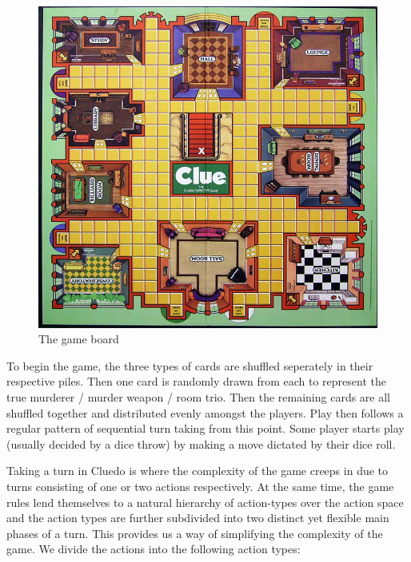 \documentclass[msc, ai, twoside, notimes, logo, parskip, leftchapter, normalheadings]{infthesis}
\begin{document}
\begin{figure}[h]
\caption{The game board}
\centering
\includegraphics[scale=.825]{figures/board}
\end{figure}

To begin the game, the three types of cards are shuffled seperately in their respective piles. Then one card is randomly drawn from each to represent the true murderer / murder weapon / room trio. Then the remaining cards are all shuffled together and distributed evenly amongst the players. Play then follows a regular pattern of sequential turn taking from this point. Some player starts play (usually decided by a dice throw) by making a move dictated by their dice roll. 

Taking a turn in Cluedo is where the complexity of the game creeps in due to turns consisting of one or two actions respectively. At the same time, the game rules lend themselves to a natural hierarchy of action-types over the action space and the action types are further subdivided into two distinct yet flexible main phases of a turn. This provides us a way of simplifying the complexity of the game. We divide the actions into the following action types:
\end{document}
